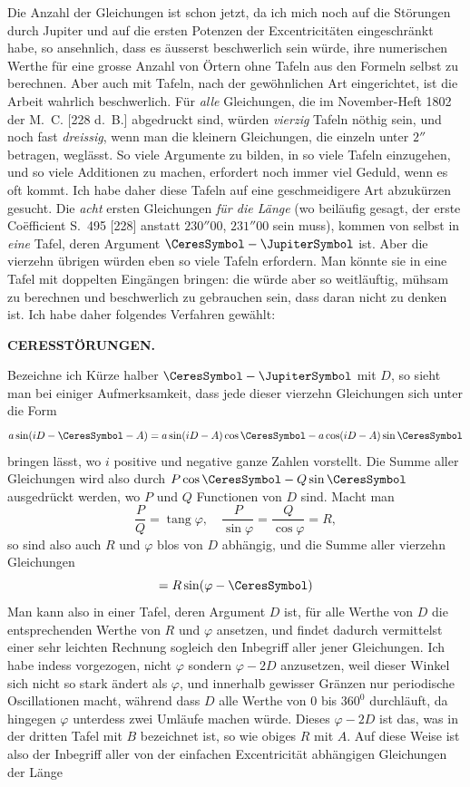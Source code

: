 Die Anzahl der Gleichungen ist schon jetzt, da ich mich noch auf die Störungen durch Jupiter und auf die ersten Potenzen der Excentricitäten eingeschränkt habe, so ansehnlich, dass es äusserst beschwerlich sein würde, ihre numerischen Werthe für eine grosse Anzahl von Örtern ohne Tafeln aus den Formeln selbst zu berechnen. Aber auch mit Tafeln, nach der gewöhnlichen Art eingerichtet, ist die Arbeit wahrlich beschwerlich. Für \textit{alle} Gleichungen, die im November-Heft 1802 der M.\ C. [228 d.\ B.] abgedruckt sind, würden \textit{vierzig} Tafeln nöthig sein, und noch fast \textit{dreissig}, wenn man die kleinern Gleichungen, die einzeln unter $2''$ betragen, weglässt. So viele Argumente zu bilden, in so viele Tafeln einzugehen, und so viele Additionen zu machen, erfordert noch immer viel Geduld, wenn es oft kommt.
Ich habe daher diese Tafeln auf eine geschmeidigere Art abzukürzen gesucht. Die \textit{acht} ersten Gleichungen \textit{für die Länge} (wo beiläufig gesagt, der erste Coëfficient S.\ 495 [228] anstatt $230''00$, $231''00$ sein muss), kommen von selbst in \textit{eine} Tafel, deren Argument $\CeresSymbol-\JupiterSymbol$ ist. Aber die vierzehn übrigen würden eben so viele Tafeln erfordern. Man könnte sie in eine Tafel mit doppelten Eingängen bringen: die würde aber so weitläuftig, mühsam zu berechnen und beschwerlich zu gebrauchen sein, dass daran nicht zu denken ist. Ich habe daher folgendes Verfahren gewählt:
\clearpage
\thispagestyle{empty}
\noindent{}%
%
\parbox[t]{\dimexpr\linewidth-24mm\relax}{\centering\footnotesize\bfseries CERES\quad STÖRUNGEN.\par}%
\makebox[12mm][r]{}\par\nobreak\medskip
\par\indent Bezeichne ich Kürze halber $\CeresSymbol-\JupiterSymbol$ mit $D$, so sieht man bei einiger Aufmerksamkeit, dass jede dieser vierzehn Gleichungen sich unter die Form
\[
a\sin(iD-\CeresSymbol-A)=a\sin(iD-A)\cos\CeresSymbol-a\cos(iD-A)\sin\CeresSymbol
\]
bringen lässt, wo $i$ positive und negative ganze Zahlen vorstellt. Die Summe aller Gleichungen wird also durch $P\cos\CeresSymbol-Q\sin\CeresSymbol$ ausgedrückt werden, wo $P$ und $Q$ Functionen von $D$ sind. Macht man
\[
\frac PQ=\operatorname{tang}\varphi,\quad
\frac P{\sin\varphi}=\frac Q{\cos\varphi}=R,
\]
so sind also auch $R$ und $\varphi$ blos von $D$ abhängig, und die Summe aller vierzehn Gleichungen
\[
=R\sin(\varphi-\CeresSymbol)
\]
Man kann also in einer Tafel, deren Argument $D$ ist, für alle Werthe von $D$ die entsprechenden Werthe von $R$ und $\varphi$ ansetzen, und findet dadurch vermittelst einer sehr leichten Rechnung sogleich den Inbegriff aller jener Gleichungen. Ich habe indess vorgezogen, nicht $\varphi$ sondern $\varphi-2D$ anzusetzen, weil dieser Winkel sich nicht so stark ändert als $\varphi$, und innerhalb gewisser Gränzen nur periodische Oscillationen macht, während dass $D$ alle Werthe von $0$ bis $360^0$ durchläuft, da hingegen $\varphi$ unterdess zwei Umläufe machen würde. Dieses $\varphi-2D$ ist das, was in der dritten Tafel mit $B$ bezeichnet ist, so wie obiges $R$ mit $A$. Auf diese Weise ist also der Inbegriff aller von der einfachen Excentricität abhängigen Gleichungen der Länge
